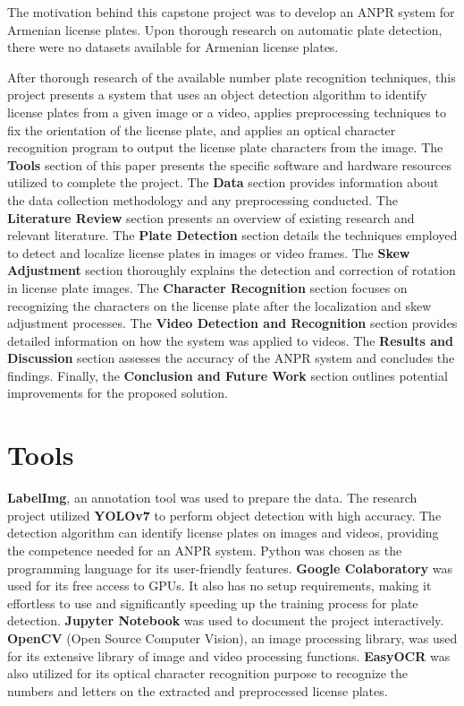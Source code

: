 \documentclass[conference]{IEEEtran}
\begin{document}
The motivation behind this capstone project was to develop an ANPR system for Armenian license plates. Upon thorough research on automatic plate detection, there were no datasets available for Armenian license plates. 

After thorough research of the available number plate recognition techniques, this project presents a system that uses an object detection algorithm to identify license plates from a given image or a video, applies preprocessing techniques to fix the orientation of the license plate, and applies an optical character recognition program to output the license plate characters from the image. 
The \textbf{Tools} section of this paper presents the specific software and hardware resources utilized to complete the project. The \textbf{Data} section provides information about the data collection methodology and any preprocessing conducted. The \textbf{Literature Review} section presents an overview of existing research and relevant literature. The \textbf{Plate Detection} section details the techniques employed to detect and localize license plates in images or video frames. The \textbf{Skew Adjustment} section thoroughly explains the detection and correction of rotation in license plate images. The \textbf{Character Recognition} section focuses on recognizing the characters on the license plate after the localization and skew adjustment processes. The \textbf{Video Detection and Recognition} section provides detailed information on how the system was applied to videos. The \textbf{Results and Discussion} section assesses the accuracy of the ANPR system and concludes the findings. Finally, the \textbf{Conclusion and Future Work} section outlines potential improvements for the proposed solution.

\section{Tools}

\textbf{LabelImg}, an annotation tool was used to prepare the data. The research project utilized \textbf{YOLOv7} to perform object detection with high accuracy. The detection algorithm can identify license plates on images and videos, providing the competence needed for an ANPR system. Python was chosen as the programming language for its user-friendly features. \textbf{Google Colaboratory} was used for its free access to GPUs. It also has no setup requirements, making it effortless to use and significantly speeding up the training process for plate detection. \textbf{Jupyter Notebook} was used to document the project interactively. \textbf{OpenCV} (Open Source Computer Vision), an image processing library, was used for its extensive library of image and video processing functions. \textbf{EasyOCR} was also utilized for its optical character recognition purpose to recognize the numbers and letters on the extracted and preprocessed license plates. 
\end{document}
